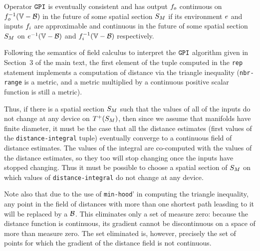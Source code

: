 \documentclass[12pt,a4paper,twoside,openright]{book}
\begin{document}
\begin{appendices}
\begin{lem}\label{thm:GPI}
  Operator $\texttt{GPI}$ is eventually consistent and has output $f_o$ continuous on $\validdomain{\field_o}$ in the future of some spatial section $S_{M}$ if its environment $e$ and inputs $f_i$ are approximable and continuous in the future of some spatial section $S_{M}$ on $\validdomain{\environment}$ and $\validdomain{\field_i}$ respectively.
\end{lem}
  Following the semantics of field calculus to interpret the $\texttt{GPI}$ algorithm given in Section~3 of the main text, the first element of the tuple computed in the {\tt rep} statement implements a computation of distance via the triangle inequality ({\tt nbr-range} is a metric, and a metric multiplied by a continuous positive scalar function is still a metric).

  Thus, if there is a spatial section $S_{M}$ such that the values of all of the inputs do not change at any device on $T^+({S_{M}})$, then since we assume that manifolds have finite diameter, it must be the case that all the distance estimates (first values of the {\tt distance-integral} tuple) eventually converge to a continuous field of distance estimates.
  The values of the integral are co-computed with the values of the distance estimates, so they too will stop changing once the inputs have stopped changing.
  Thus it must be possible to choose a spatial section of $S_{M}$ on which values of {\tt distance-integral} do not change at any device.

  Note also that due to the use of {\tt min-hood}' in computing the triangle inequality, any point in the field of distances with more than one shortest path leasding to it will be replaced by a $\mathcal{B}$.
  This eliminates only a set of measure zero: because the distance function is continuous, its gradient cannot be discontinuous on a space of more than measure zero.
  The set eliminated is, however, precisely the set of points for which the gradient of the distance field is not continuous.


\end{appendices}
\end{document}
